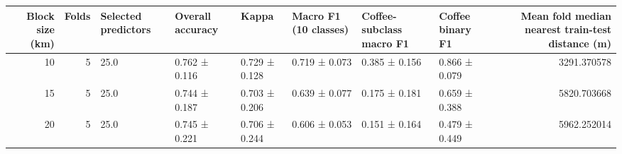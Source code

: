 \begin{tabular}{rrllllllr}
\toprule
Block size (km) & Folds & Selected predictors & Overall accuracy & Kappa & Macro F1 (10 classes) & Coffee-subclass macro F1 & Coffee binary F1 & Mean fold median nearest train-test distance (m) \\
\midrule
10 & 5 & 25.0 & 0.762 ± 0.116 & 0.729 ± 0.128 & 0.719 ± 0.073 & 0.385 ± 0.156 & 0.866 ± 0.079 & 3291.370578 \\
15 & 5 & 25.0 & 0.744 ± 0.187 & 0.703 ± 0.206 & 0.639 ± 0.077 & 0.175 ± 0.181 & 0.659 ± 0.388 & 5820.703668 \\
20 & 5 & 25.0 & 0.745 ± 0.221 & 0.706 ± 0.244 & 0.606 ± 0.053 & 0.151 ± 0.164 & 0.479 ± 0.449 & 5962.252014 \\
\bottomrule
\end{tabular}
